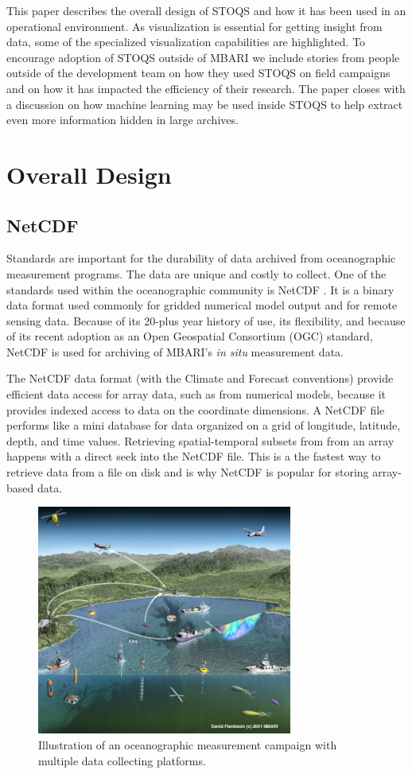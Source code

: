 \documentclass[conference]{IEEEtran}
\begin{document}
This paper describes the overall design of STOQS and how it has been used in an operational environment. As visualization is essential for getting insight from data, some of the specialized visualization capabilities are highlighted. To encourage adoption of STOQS outside of MBARI we include stories from people outside of the development team on how they used STOQS on field campaigns and on how it has impacted the efficiency of their research. The paper closes with a discussion on how machine learning may be used inside STOQS to help extract even more information hidden in large archives.


\section{Overall Design}

\subsection{NetCDF}

Standards are important for the durability of data archived from oceanographic measurement programs. The data are unique and costly to collect. One of the standards used within the oceanographic community is NetCDF \cite{Rew1990}. It is a binary data format used commonly for gridded numerical model output and for remote sensing data. Because of its 20-plus year history of use, its flexibility, and because of its recent adoption as an Open Geospatial Consortium (OGC) standard, NetCDF is used for archiving of MBARI's \textit{in situ} measurement data.

The NetCDF data format (with the Climate and Forecast conventions) provide efficient data access for array data, such as from numerical models, because it provides indexed access to data on the coordinate dimensions. A NetCDF file performs like a mini database for data organized on a grid of longitude, latitude, depth, and time values. Retrieving spatial-temporal subsets from from an array happens with a direct seek into the NetCDF file. This is a the fastest way to retrieve data from a file on disk and is why NetCDF is popular for storing array-based data.

\begin{figure}[htbp]
\centering
\includegraphics[width=3.3in]{MUSE_illus_pp.jpg}
\caption{Illustration of an oceanographic measurement campaign with multiple data collecting platforms.}
\label{fig:MUSE_illus_pp}
\end{figure}
\end{document}
